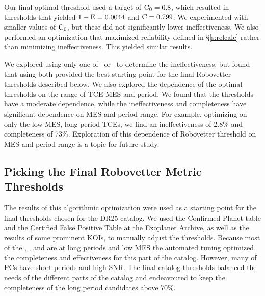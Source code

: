 Our final optimal threshold used a target of ${\rm C}_0 = 0.8$, which resulted in thresholds that yielded ${\rm 1-E} = 0.0044$ and ${\rm C} = 0.799$.  We experimented with smaller values of ${\rm C}_0$, but these did not significantly lower ineffectiveness.   We also performed an optimization that maximized reliability defined in \S\ref{s:relcalc} rather than minimizing ineffectiveness. This yielded similar results.

We explored using only one of \scrtce\ or \invtce\ to determine the ineffectiveness, but found that using both provided the best starting point for the final Robovetter thresholds described below.  We also explored the dependence of the optimal thresholds on the range of TCE MES and period.  We found that the thresholds have a moderate dependence, while the ineffectiveness and completeness have significant dependence on MES and period range.  For example, optimizing on only the low-MES, long-period TCEs, we find an ineffectiveness of 2.8\% and completeness of 73\%.  Exploration of this dependence of Robovetter threshold on MES and period range is a topic for future study.


\subsection{Picking the Final Robovetter Metric Thresholds}

The results of this algorithmic optimization were used as a starting point for the final thresholds chosen for the DR25 catalog. We used the Confirmed Planet table and the Certified False Positive Table at the Exoplanet Archive, as well as the results of some prominent KOIs, to manually adjust the thresholds.  Because most of the , , and  are at long periods and low MES the automated tuning optimized the completeness and effectiveness for this part of the catalog. However, many of  PCs have short periods and high SNR. The final catalog thresholds balanced the needs of the different parts of the catalog and endeavoured to keep the completeness of the long period candidates above 70\%.

